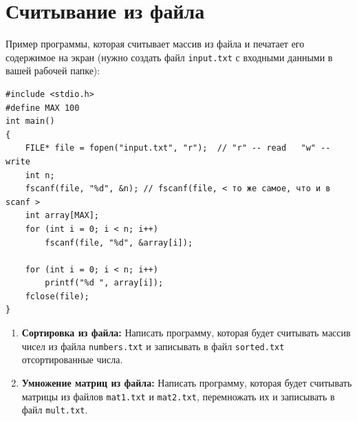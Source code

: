 \documentclass{article}
\begin{document}
\section*{Считывание из файла}
Пример программы, которая считывает массив из файла и печатает его содержимое на экран (нужно создать файл \texttt{input.txt} с входными данными в вашей рабочей папке):
\begin{lstlisting}
#include <stdio.h>
#define MAX 100
int main() 
{
    FILE* file = fopen("input.txt", "r");  // "r" -- read   "w" -- write
    int n;
    fscanf(file, "%d", &n); // fscanf(file, < то же самое, что и в scanf >
    int array[MAX];
    for (int i = 0; i < n; i++)
        fscanf(file, "%d", &array[i]);
    
    for (int i = 0; i < n; i++)
        printf("%d ", array[i]);
    fclose(file);
}
\end{lstlisting}
\begin{enumerate}
\item \textbf{Сортировка из файла:} Написать программу, которая будет считывать массив чисел из файла \texttt{numbers.txt} и записывать в файл \texttt{sorted.txt} отсортированные числа.
\item \textbf{Умножение матриц из файла:} Написать программу, которая будет считывать матрицы из файлов \texttt{mat1.txt} и \texttt{mat2.txt}, перемножать их и записывать в файл \texttt{mult.txt}.
\end{enumerate}
\end{document}
